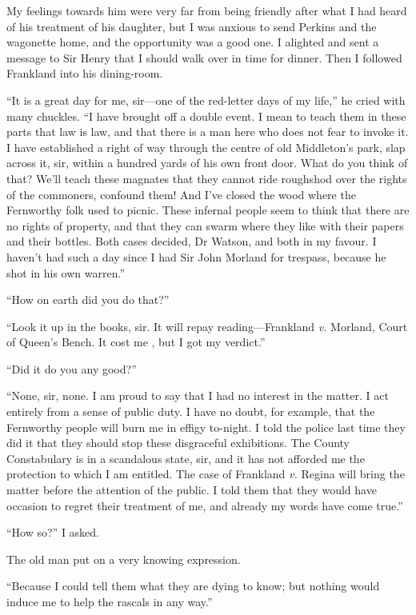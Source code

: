 \documentclass[paper=5.5in:8.5in,BCOR=7mm,twoside,DIV=calc,12pt,usegeometry,openany,chapterprefix,endperiod,headings=big]{scrbook} %
\begin{document}
My feelings towards him were very far from being friendly after what I had heard of his treatment of his daughter, but I was anxious to send Perkins and the wagonette home, and the opportunity was a good one. I alighted and sent a message to Sir Henry that I should walk over in time for dinner. Then I followed Frankland into his dining-room.

\enquote{It is a great day for me, sir---one of the red-letter days of my life,} he cried with many chuckles. \enquote{I have brought off a double event. I mean to teach them in these parts that law is law, and that there is a man here who does not fear to invoke it. I have established a right of way through the centre of old Middleton's park, slap across it, sir, within a hundred yards of his own front door. What do you think of that? We'll teach these magnates that they cannot ride roughshod over the rights of the commoners, confound them! And I've closed the wood where the Fernworthy folk used to picnic. These infernal people seem to think that there are no rights of property, and that they can swarm where they like with their papers and their bottles. Both cases decided, Dr Watson, and both in my favour. I haven't had such a day since I had Sir John Morland for trespass, because he shot in his own warren.}

\enquote{How on earth did you do that?}

\enquote{Look it up in the books, sir. It will repay reading---Frankland \textit{v.} Morland, Court of Queen's Bench. It cost me , but I got my verdict.}

\enquote{Did it do you any good?}

\enquote{None, sir, none. I am proud to say that I had no interest in the matter. I act entirely from a sense of public duty. I have no doubt, for example, that the Fernworthy people will burn me in effigy to-night. I told the police last time they did it that they should stop these disgraceful exhibitions. The County Constabulary is in a scandalous state, sir, and it has not afforded me the protection to which I am entitled. The case of Frankland \textit{v.} Regina will bring the matter before the attention of the public. I told them that they would have occasion to regret their treatment of me, and already my words have come true.}

\enquote{How so?} I asked.

The old man put on a very knowing expression.

\enquote{Because I could tell them what they are dying to know; but nothing would induce me to help the rascals in any way.}
\end{document}

